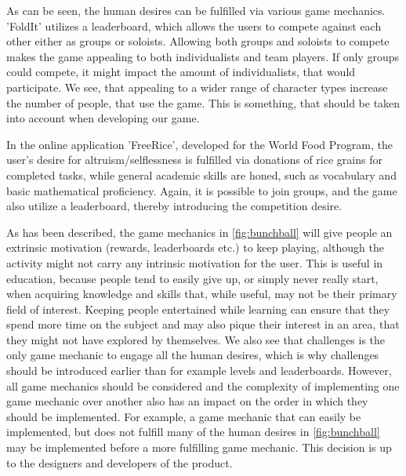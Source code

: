 As can be seen, the human desires can be fulfilled via various game mechanics.
'FoldIt' utilizes a leaderboard, which allows the users to compete against each other either as groups or soloists.
Allowing both groups and soloists to compete makes the game appealing to both individualists and team players.
If only groups could compete, it might impact the amount of individualists, that would participate.
We see, that appealing to a wider range of character types increase the number of people, that use the game.
This is something, that should be taken into account when developing our game.\newline

In the online application 'FreeRice', developed for the World Food Program, the user's desire for altruism/selflessness is fulfilled via donations of rice grains for completed tasks, while general academic skills are honed, such as vocabulary and basic mathematical proficiency. Again, it is possible to join groups, and the game also utilize a leaderboard, thereby introducing the competition desire.\cite{freerice}\newline

As has been described, the game mechanics in \autoref{fig:bunchball} will give people an extrinsic motivation (rewards, leaderboards etc.) to keep playing, although the activity might not carry any intrinsic motivation for the user.
This is useful in education, because people tend to easily give up, or simply never really start, when acquiring knowledge and skills that, while useful, may not be their primary field of interest.
Keeping people entertained while learning can ensure that they spend more time on the subject and may also pique their interest in an area, that they might not have explored by themselves.
We also see that challenges is the only game mechanic to engage all the human desires, which is why challenges should be introduced earlier than for example levels and leaderboards.
However, all game mechanics should be considered and the complexity of implementing one game mechanic over another also has an impact on the order in which they should be implemented.
For example, a game mechanic that can easily be implemented, but does not fulfill many of the human desires in \autoref{fig:bunchball} may be implemented before a more fulfilling game mechanic.
This decision is up to the designers and developers of the product.
